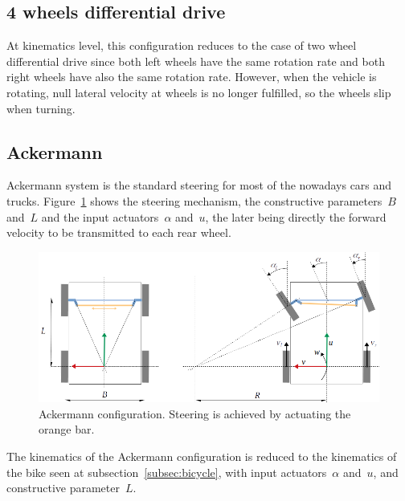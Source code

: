 \subsection{4 wheels differential drive}
At kinematics level, this configuration reduces to the case of two wheel differential drive since both left wheels have the same rotation rate and both right wheels have also the same rotation rate. However, when the vehicle is rotating, null lateral velocity at wheels is no longer fulfilled, so the wheels slip when turning. 


\subsection{Ackermann}
Ackermann system is the standard steering for most of the nowadays cars and trucks. Figure~\ref{fig:ackermann_kinematics} shows the steering mechanism, the constructive parameters~$B$ and~$L$ and the input actuators~$\alpha$ and~$u$, the later being directly the forward velocity to be transmitted to each rear wheel.  
\begin{figure}[bth!]
  \begin{center}
    \includegraphics[width=1.0\columnwidth]{figures/ackermann_kinematics.png}
    \caption{Ackermann configuration. Steering is achieved by actuating the orange bar.  }
    \label{fig:ackermann_kinematics}
  \end{center}
\end{figure}

The kinematics of the Ackermann configuration is reduced to the kinematics of the bike seen at subsection~\ref{subsec:bicycle}, with input actuators~$\alpha$ and~$u$, and constructive parameter~$L$.

